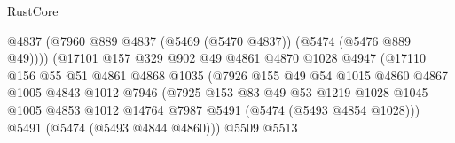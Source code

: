 \begin{lexlean}{RustCore}
\begin{coremodule}
                                        @4837
                                        (@7960
                                          @889
                                          @4837
                                          (@5469 (@5470 @4837))
                                          (@5474 (@5476 @889 @49))))
                                      (@17101
                                        @157
                                        @329
                                        @902
                                        @49
                                        @4861
                                        @4870
                                        @1028
                                        @4947
                                        (@17110
                                          @156
                                          @55
                                          @51
                                          @4861
                                          @4868
                                          @1035
                                          (@7926
                                            @155
                                            @49
                                            @54
                                            @1015
                                            @4860
                                            @4867
                                            @1005
                                            @4843
                                            @1012
                                            @7946
                                            (@7925
                                              @153
                                              @83
                                              @49
                                              @53
                                              @1219
                                              @1028
                                              @1045
                                              @1005
                                              @4853
                                              @1012
                                              @14764
                                              @7987
                                              @5491
                                              (@5474 (@5493 @4854 @1028)))
                                            @5491
                                            (@5474 (@5493 @4844 @4860)))
                                          @5509
                                          @5513

\end{coremodule}
\end{lexlean}
